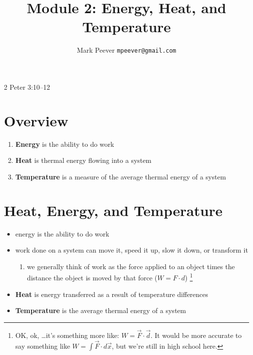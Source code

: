 \documentclass[11pt, oneside]{article}   	%
\title{Module 2: Energy, Heat, and Temperature }
\author{Mark Peever \texttt{mpeever@gmail.com}}
\begin{document}
\maketitle

\begin{center}
2 Peter 3:10--12
\end{center}

\section{Overview}
\begin{enumerate}
\item \textbf{Energy} is the ability to do work
\item \textbf{Heat} is thermal energy flowing into a system
\item \textbf{Temperature} is a measure of the average thermal energy of a system
\end{enumerate}

\section{Heat, Energy, and Temperature}
\begin{itemize}
\item energy is the ability to do work
\item work done on a system can move it, speed it up, slow it down, or transform it
\begin{enumerate}
\item we generally think of work as the force applied to an object times the distance the object is moved by that force ($W = F \cdot d$)
\footnote{OK, ok, \ldots it's something more like: $W = \vec{F} \cdot \vec{d}$. It would be more accurate to say something like  $W = \int \vec{F} \cdot d\vec{x}$, but we're still in high school here.}
\end{enumerate}
\item \textbf{Heat} is energy transferred as a result of temperature differences
\item \textbf{Temperature} is the average thermal energy of a system
\end{itemize}
\end{document}
